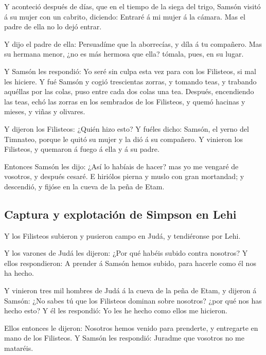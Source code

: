  Y aconteció después de días, que en el tiempo de la siega
del trigo, Samsón visitó á su mujer con un cabrito, diciendo: Entraré á
mi mujer á la cámara. Mas el padre de ella no lo dejó entrar.

 Y dijo el padre de ella: Persuadíme que la aborrecías, y
díla á tu compañero. Mas su hermana menor, ¿no es más hermosa que ella?
tómala, pues, en su lugar.

 Y Samsón les respondió: Yo seré sin culpa esta vez para
con los Filisteos, si mal les hiciere.  Y fué Samsón y
cogió trescientas zorras, y tomando teas, y trabando aquéllas por las
colas, puso entre cada dos colas una tea.  Después,
encendiendo las teas, echó las zorras en los sembrados de los Filisteos,
y quemó hacinas y mieses, y viñas y olivares.

 Y dijeron los Filisteos: ¿Quién hizo esto? Y fuéles
dicho: Samsón, el yerno del Timnateo, porque le quitó su mujer y la dió
á su compañero. Y vinieron los Filisteos, y quemaron á fuego á ella y á
su padre.

 Entonces Samsón les dijo: ¿Así lo habíais de hacer? mas
yo me vengaré de vosotros, y después cesaré.  E hiriólos
pierna y muslo con gran mortandad; y descendió, y fijóse en la cueva de
la peña de Etam.

\hypertarget{captura-y-explotaciuxf3n-de-simpson-en-lehi}{%
\subsection{Captura y explotación de Simpson en
Lehi}\label{captura-y-explotaciuxf3n-de-simpson-en-lehi}}

 Y los Filisteos subieron y pusieron campo en Judá, y
tendiéronse por Lehi.

 Y los varones de Judá les dijeron: ¿Por qué habéis
subido contra nosotros? Y ellos respondieron: A prender á Samsón hemos
subido, para hacerle como él nos ha hecho.

 Y vinieron tres mil hombres de Judá á la cueva de la
peña de Etam, y dijeron á Samsón: ¿No sabes tú que los Filisteos dominan
sobre nosotros? ¿por qué nos has hecho esto? Y él les respondió: Yo les
he hecho como ellos me hicieron.

 Ellos entonces le dijeron: Nosotros hemos venido para
prenderte, y entregarte en mano de los Filisteos. Y Samsón les
respondió: Juradme que vosotros no me mataréis.

